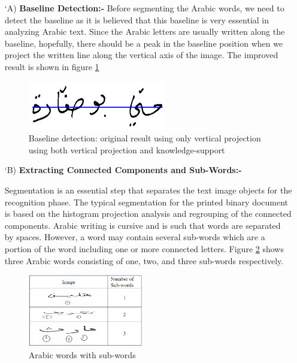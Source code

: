 \begin{itemize}[labelindent=1em,labelsep=0.25cm,leftmargin=*]
        \item[\char `A)] \textbf{Baseline Detection:-}
        Before  segmenting  the  Arabic  words,  we  need  to detect  the  baseline  as  it  is  believed  that  this  baseline  is  very  essential  in  analyzing  Arabic  text.  Since  the  Arabic  letters  are  usually written along the baseline, hopefully, there should be a peak in the baseline position when we project the written line along the vertical axis of the image.
        The  improved result is shown in figure \ref{fig:basline}
 
         \begin{figure}[!htb]
            \centering
            \includegraphics[width=6cm]{images/basline.png}
            \caption{Baseline detection: original result using only vertical projection using both vertical projection and knowledge-support}
            \label{fig:basline}
        \end{figure}
        
        \item[\char `B)] \textbf{Extracting Connected Components and Sub-Words:-}
        
        Segmentation is an essential step that separates the text image objects for the recognition phase. The typical segmentation for the printed binary document is based on the histogram projection analysis and regrouping of the connected components. Arabic writing is cursive  and is such that words are separated by spaces. However,  a  word may contain several sub-words which are a portion  of  the  word including one or more connected letters.
Figure \ref{fig:subword} shows three Arabic words consisting of one, two, and three sub-words respectively. 

 \begin{figure}[!htb]
    \centering
    \includegraphics[width=5cm]{images/subword.png}
    \caption{Arabic words with sub-words}
    \label{fig:subword}
\end{figure}


\end{itemize}
